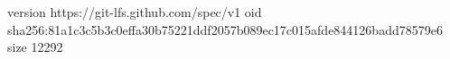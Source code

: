 version https://git-lfs.github.com/spec/v1
oid sha256:81a1c3c5b3c0effa30b75221ddf2057b089ec17c015afde844126badd78579e6
size 12292
